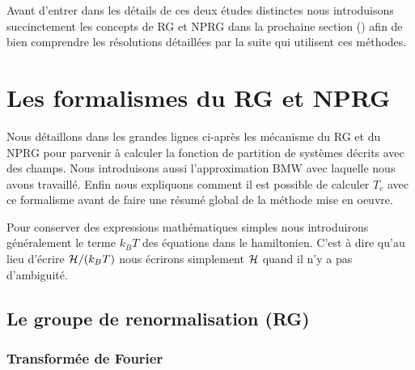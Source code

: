 \documentclass[10.5pt]{article}
\begin{document}
\begin{multicols*}{2}
Avant d'entrer dans les détails de ces deux études distinctes nous introduisons succinctement les concepts de RG et NPRG dans la prochaine section () afin de bien comprendre les résolutions détaillées par la suite qui utilisent ces méthodes.

\newpage






\section{Les formalismes du RG et NPRG}

\label{sec:RGGeneral}

Nous détaillons dans les grandes lignes ci-après les mécanisme du RG et du NPRG pour parvenir à calculer la fonction de partition de systèmes décrits avec des champs. Nous introduisons aussi l'approximation BMW avec laquelle nous avons travaillé. Enfin nous expliquons comment il est possible de calculer $T_c$ avec ce formalisme avant de faire une résumé global de la méthode mise en oeuvre.

Pour conserver des expressions mathématiques simples nous introduirons généralement le terme $k_B T$ des équations dans le hamiltonien. C'est à dire qu'au lieu d'écrire $\mathcal{H}/(k_BT)$ nous écrirons simplement $\mathcal{H}$ quand il n'y a pas d'ambiguité.


\subsection{Le groupe de renormalisation (RG)}
\subsubsection{Transformée de Fourier}

\label{sec:TF}


\end{multicols*}
\end{document}
